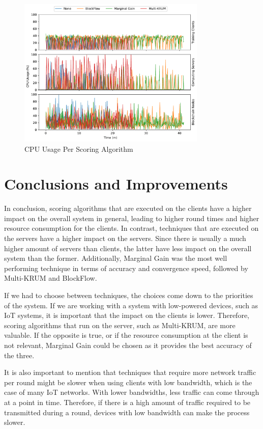\begin{figure}[!hpb]
    \centering
    \centering
    \includegraphics[width=0.8\textwidth]{graphics/scoring/cpu.pdf}
    \caption{CPU Usage Per Scoring Algorithm}
    \label{fig:cpu_scoring}
\end{figure}

\vfill

\section{Conclusions and Improvements}

In conclusion, scoring algorithms that are executed on the clients have a higher impact on the overall system in general, leading to higher round times and higher resource consumption for the clients. In contrast, techniques that are executed on the servers have a higher impact on the servers. Since there is usually a much higher amount of servers than clients, the latter have less impact on the overall system than the former. Additionally, Marginal Gain was the most well performing technique in terms of accuracy and convergence speed, followed by Multi-KRUM and BlockFlow.

If we had to choose between techniques, the choices come down to the priorities of the system. If we are working with a system with low-powered devices, such as IoT systems, it is important that the impact on the clients is lower. Therefore, scoring algorithms that run on the server, such as Multi-KRUM, are more valuable. If the opposite is true, or if the resource consumption at the client is not relevant, Marginal Gain could be chosen as it provides the best accuracy of the three.

It is also important to mention that techniques that require more network traffic per round might be slower when using clients with low bandwidth, which is the case of many IoT networks. With lower bandwidths, less traffic can come through at a point in time. Therefore, if there is a high amount of traffic required to be transmitted during a round, devices with low bandwidth can make the process slower.

